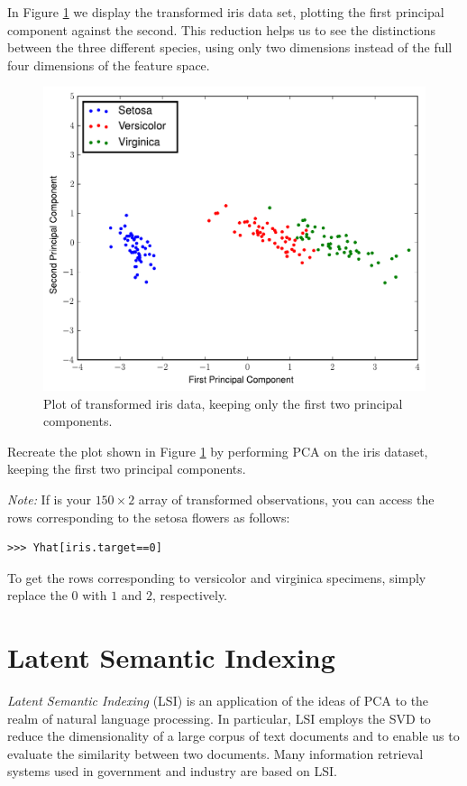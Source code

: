 In Figure \ref{fig:iris_pca} we display the transformed iris data set, plotting the first principal component against the second. This reduction helps us to see the distinctions between the three different species, using only two dimensions instead of the full four dimensions of the feature space.
\begin{figure}
\includegraphics[width=\textwidth]{iris_pca.pdf}
\caption{Plot of transformed iris data, keeping only the first two principal components.}
\label{fig:iris_pca}
\end{figure}

\begin{problem}
Recreate the plot shown in Figure \ref{fig:iris_pca} by performing PCA on the iris dataset, keeping the first two principal components.

\emph{Note:}
If  is your $150 \times 2$ array of transformed observations, you can access the rows corresponding to the setosa flowers as follows:
\begin{lstlisting}
>>> Yhat[iris.target==0]
\end{lstlisting}
To get the rows corresponding to versicolor and virginica specimens, simply replace the $0$ with $1$ and $2$, respectively.
\end{problem}

\section*{Latent Semantic Indexing}
\emph{Latent Semantic Indexing} (LSI) is an application of the ideas of PCA to the realm of natural language processing.
In particular, LSI employs the SVD to reduce the dimensionality of a large corpus of text documents and to enable us to evaluate the similarity between two documents.
Many information retrieval systems used in government and industry are based on LSI.

